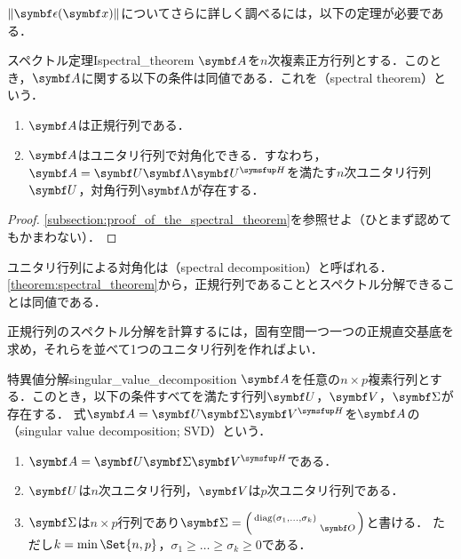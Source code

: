 \documentclass[../../main]{subfiles}
\begin{document}
\(\vnorm{\vect{\epsilon}(\vect{x})}\)についてさらに詳しく調べるには，以下の定理が必要である．

\begin{theorem}{スペクトル定理I}{spectral_theorem}
  \(\mat{A}\)を\(n\)次複素正方行列とする．このとき，\(\mat{A}\)に関する以下の条件は同値である．これを（spectral theorem）という．
  \begin{enumerate}
    \item \(\mat{A}\)は正規行列である．
    \item \(\mat{A}\)はユニタリ行列で対角化できる．すなわち，\(\mat{A}=\mat{U}\mat{\Lambda}\htrps{\mat{U}}\)を満たす\(n\)次ユニタリ行列\(\mat{U}\)，対角行列\(\mat{\Lambda}\)が存在する．
  \end{enumerate}
\end{theorem}

\begin{proof}
  \cref{subsection:proof_of_the_spectral_theorem}を参照せよ（ひとまず認めてもかまわない）．
\end{proof}

ユニタリ行列による対角化は（spectral decomposition）と呼ばれる．
\cref{theorem:spectral_theorem}から，正規行列であることとスペクトル分解できることは同値である．

\begin{note}
  正規行列のスペクトル分解を計算するには，固有空間一つ一つの正規直交基底を求め，それらを並べて1つのユニタリ行列を作ればよい．
\end{note}

\begin{corollary}{特異値分解}{singular_value_decomposition}
  \(\mat{A}\)を任意の\(n\times p\)複素行列とする．このとき，以下の条件すべてを満たす行列\(\mat{U}\)，\(\mat{V}\)，\(\mat{\Sigma}\)が存在する．
  式\(\mat{A}=\mat{U}\mat{\Sigma}\htrps{\mat{V}}\)を\(\mat{A}\)の（singular value decomposition; SVD）という．
  \begin{enumerate}
    \item \(\mat{A}=\mat{U}\mat{\Sigma}\htrps{\mat{V}}\)である．
    \item \(\mat{U}\)は\(n\)次ユニタリ行列，\(\mat{V}\)は\(p\)次ユニタリ行列である．
    \item \(\mat{\Sigma}\)は\(n\times p\)行列であり\(\mat{\Sigma}=\smallmatrice{\diag(\sigma_1,\dots,\sigma_k) & \\ & \zmat}\)と書ける．
      ただし\(k=\min\Set{n,p}\)，\(\sigma_1\geq\dots\geq\sigma_k\geq 0\)である．
  \end{enumerate}
\end{corollary}
\end{document}
